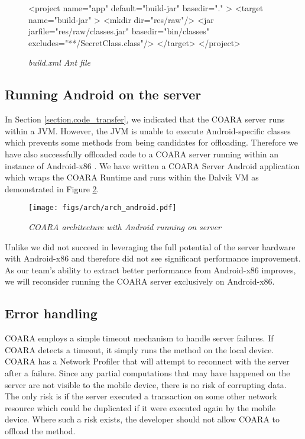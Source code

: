 \documentclass[10pt,journal,cspaper,compsoc]{IEEEtran}
\begin{document}
{\begin{figure}
\caption{\small\textsl{build.xml Ant file}}
\begin{code}
<project name="app" default="build-jar" basedir="." >
  <target name="build-jar" >
    <mkdir dir="res/raw"/>
    <jar jarfile="res/raw/classes.jar"
      basedir="bin/classes"
      excludes="**/SecretClass.class"/>
  </target>
</project>
\end{code}
\label{fig:build.xml}
\end{figure}

\subsection{Running Android on the server}


In Section \ref{section.code_transfer}, we indicated that the COARA server runs within a JVM.  However, the JVM is unable to execute Android-specific classes which prevents some methods from being candidates for offloading.  Therefore we have also successfully offloaded code to a COARA server running within an instance of Android-x86 \cite{androidx86:Online}.  We have written a COARA Server Android application which wraps the COARA Runtime and runs within the Dalvik VM as demonstrated in Figure \ref{fig:arch_android}.

\begin{figure}
\centering
\texttt{[image: figs/arch/arch\_android.pdf]}
\caption{\small\textsl{COARA architecture with Android running on server}}
\label{fig:arch_android}
\end{figure}


Unlike \cite{Chen_Androidx86:2010bx} we did not succeed in leveraging the full potential of the server hardware with Android-x86 and therefore did not see significant performance improvement. As our team's ability to extract better performance from Android-x86 improves, we will reconsider running the COARA server exclusively on Android-x86.

\subsection{Error handling}
COARA employs a simple timeout mechanism to handle server failures.  If COARA detects a timeout, it simply runs the method on the local device.  COARA has a Network Profiler that will attempt to reconnect with the server after a failure.  Since any partial computations that may have happened on the server are not visible to the mobile device, there is no risk of corrupting data.  The only risk is if the server executed a transaction on some other network resource which could be duplicated if it were executed again by the mobile device.  Where such a risk exists, the developer should not allow COARA to offload the method.


}
\end{document}
